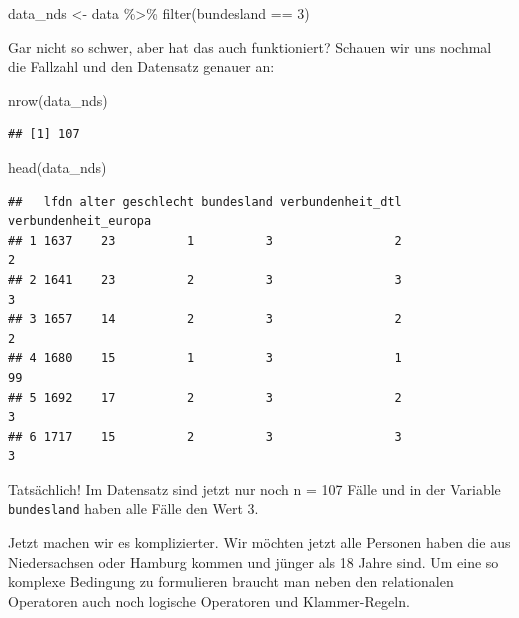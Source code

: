 \documentclass[
]{book}
\newenvironment{Shaded}{\begin{snugshade}}{\end{snugshade}}
\newcommand{\DecValTok}[1]{\textcolor[rgb]{0.00,0.00,0.81}{#1}}
\newcommand{\FunctionTok}[1]{\textcolor[rgb]{0.00,0.00,0.00}{#1}}
\newcommand{\NormalTok}[1]{#1}
\newcommand{\OtherTok}[1]{\textcolor[rgb]{0.56,0.35,0.01}{#1}}
\newcommand{\SpecialCharTok}[1]{\textcolor[rgb]{0.00,0.00,0.00}{#1}}
\begin{document}
\begin{Shaded}
\begin{Highlighting}[]
\NormalTok{data\_nds }\OtherTok{\textless{}{-}}\NormalTok{ data }\SpecialCharTok{\%\textgreater{}\%} 
  \FunctionTok{filter}\NormalTok{(bundesland }\SpecialCharTok{==} \DecValTok{3}\NormalTok{)}
\end{Highlighting}
\end{Shaded}

Gar nicht so schwer, aber hat das auch funktioniert? Schauen wir uns nochmal die Fallzahl und den Datensatz genauer an:

\begin{Shaded}
\begin{Highlighting}[]
\FunctionTok{nrow}\NormalTok{(data\_nds)}
\end{Highlighting}
\end{Shaded}

\begin{verbatim}
## [1] 107
\end{verbatim}

\begin{Shaded}
\begin{Highlighting}[]
\FunctionTok{head}\NormalTok{(data\_nds)}
\end{Highlighting}
\end{Shaded}

\begin{verbatim}
##   lfdn alter geschlecht bundesland verbundenheit_dtl verbundenheit_europa
## 1 1637    23          1          3                 2                    2
## 2 1641    23          2          3                 3                    3
## 3 1657    14          2          3                 2                    2
## 4 1680    15          1          3                 1                   99
## 5 1692    17          2          3                 2                    3
## 6 1717    15          2          3                 3                    3
\end{verbatim}

Tatsächlich! Im Datensatz sind jetzt nur noch n = 107 Fälle und in der Variable \texttt{bundesland} haben alle Fälle den Wert 3.

Jetzt machen wir es komplizierter. Wir möchten jetzt alle Personen haben die aus Niedersachsen oder Hamburg kommen und jünger als 18 Jahre sind. Um eine so komplexe Bedingung zu formulieren braucht man neben den relationalen Operatoren auch noch logische Operatoren und Klammer-Regeln.
\end{document}
